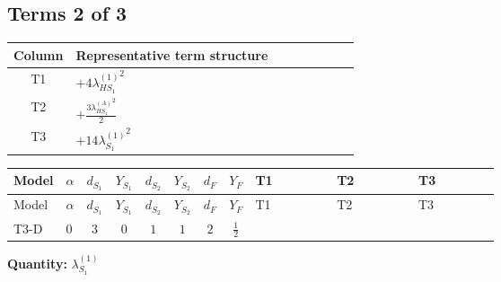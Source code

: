 \documentclass[8pt]{article}
\begin{document}
\begin{landscape}
\subsection*{Terms 2 of 3}
\begin{center}
\begin{tabular}{@{}c >{\raggedright\arraybackslash}p{0.82\linewidth}@{}}
\toprule
Column & Representative term structure \\
\midrule
T1 & \(\displaystyle +4 {\lambda_{HS_1}^{(1)}}^2\) \\
\midrule
T2 & \(\displaystyle +\frac{3 {\lambda_{HS_1}^{(A)}}^2}{2}\) \\
\midrule
T3 & \(\displaystyle +14 {\lambda_{S_1}^{(1)}}^2\) \\
\midrule
\bottomrule
\end{tabular}
\end{center}
\smallskip
\tiny
\begin{longtable}{@{}llcccccc >{\raggedright\arraybackslash}p{0.21\linewidth} >{\raggedright\arraybackslash}p{0.21\linewidth} >{\raggedright\arraybackslash}p{0.21\linewidth}@{}}
\toprule
Model & $\alpha$ & $d_{S_1}$ & $Y_{S_1}$ & $d_{S_2}$ & $Y_{S_2}$ & $d_F$ & $Y_F$ & T1 & T2 & T3 \\
\midrule
\endfirsthead
\toprule
Model & $\alpha$ & $d_{S_1}$ & $Y_{S_1}$ & $d_{S_2}$ & $Y_{S_2}$ & $d_F$ & $Y_F$ & T1 & T2 & T3 \\
\midrule
\endhead
T3-D & $0$ & $3$ & $0$ & $1$ & $1$ & $2$ & $\frac{1}{2}$ & \scriptsize\adjustbox{max width=\linewidth}{$\begin{gathered} +4 {\lambda_{HS_1}^{(1)}}^2\end{gathered}$} & \scriptsize\adjustbox{max width=\linewidth}{$\begin{gathered} +\frac{3 {\lambda_{HS_1}^{(A)}}^2}{2}\end{gathered}$} & \scriptsize\adjustbox{max width=\linewidth}{$\begin{gathered} +14 {\lambda_{S_1}^{(1)}}^2\end{gathered}$} \\
\midrule
\bottomrule
\end{longtable}
\clearpage
\noindent\textbf{Quantity: }$\lambda_{S_1}^{(1)}$\par\smallskip

\end{landscape}
\end{document}
